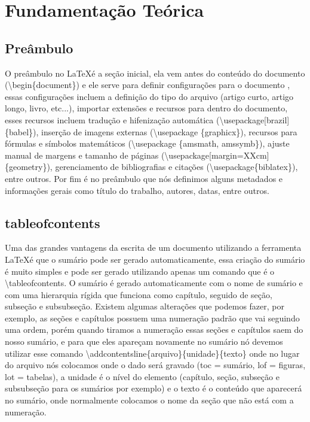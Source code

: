 

\chapter{Fundamentação Teórica}

\section{Preâmbulo}
O preâmbulo no \LaTeX é a seção inicial, ela vem antes do conteúdo do documento (\textbackslash begin\{document\}) e ele serve para definir configurações para o documento \cite{uiw2026latex}, essas configurações incluem a definição do tipo do arquivo (artigo curto, artigo longo, livro, etc...), importar extensões e recursos para dentro do documento, esses recursos incluem tradução e hifenização automática (\textbackslash  usepackage[brazil]\{babel\}), inserção de imagens externas (\textbackslash usepackage \{graphicx\}), recursos para fórmulas e símbolos matemáticos (\textbackslash usepackage \{amsmath, amssymb\}), ajuste manual de margens e tamanho de páginas (\textbackslash usepackage[margin=XXcm]\{geometry\}), gerenciamento de bibliografias e citações (\textbackslash usepackage\{biblatex\}), entre outros. Por fim é no preâmbulo que nós definimos alguns metadados e informações gerais como título do trabalho, autores, datas, entre outros.

\section{tableofcontents}
Uma das grandes vantagens da escrita de um documento utilizando a ferramenta \LaTeX é que o sumário pode ser gerado automaticamente, essa criação do sumário é muito simples e pode ser gerado utilizando apenas um comando que é o \textbackslash tableofcontents. O sumário é gerado automaticamente com o nome de sumário e com uma hierarquia rígida que funciona como capítulo, seguido de seção, subseção e subsubseção. Existem algumas alterações que podemos fazer, por exemplo, as seções e capítulos possuem uma numeração padrão que vai seguindo uma ordem, porém quando tiramos a numeração essas seções e capítulos saem do nosso sumário, e para que eles apareçam novamente no sumário nó devemos utilizar esse comando \textbackslash addcontentsline\{arquivo\}\{unidade\}\{texto\} onde no lugar do arquivo nós colocamos onde o dado será gravado (toc = sumário, lof = figuras, lot = tabelas), a unidade é o nível do elemento (capítulo, seção, subseção e subsubseção para os sumários por exemplo) e o texto é o conteúdo que aparecerá no sumário, onde normalmente colocamos o nome da seção que não está com a numeração.

